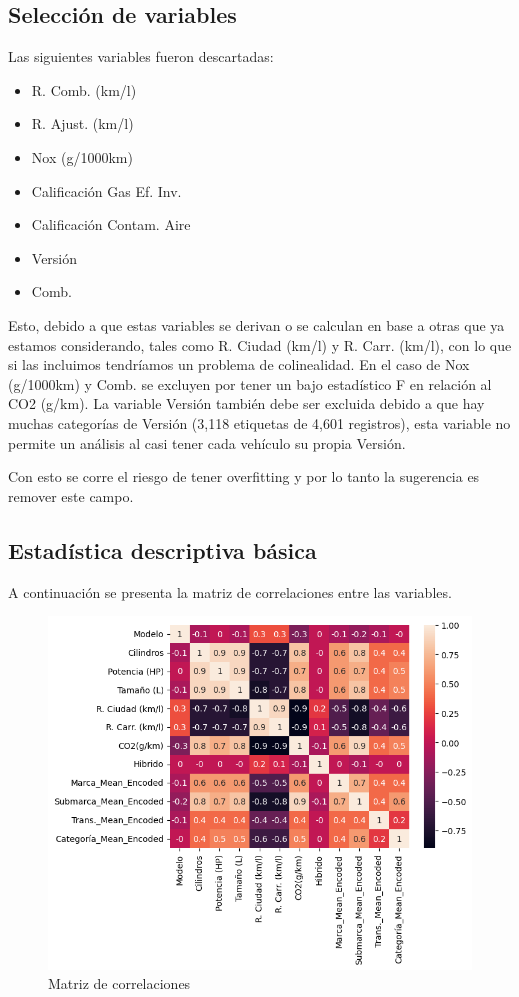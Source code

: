 \documentclass{article}
\begin{document}
\subsection{Selección de variables}

Las siguientes variables fueron descartadas:

\begin{itemize}
    \item R. Comb. (km/l)
    \item R. Ajust. (km/l)
    \item Nox (g/1000km)
    \item Calificación Gas Ef. Inv.
    \item Calificación Contam. Aire
    \item Versión
    \item Comb.
\end{itemize}

Esto, debido a que estas variables se derivan o se calculan en base a otras que ya estamos considerando, tales como R. Ciudad (km/l) y R. Carr. (km/l), con lo que si las incluimos tendríamos un problema de colinealidad. En el caso de Nox (g/1000km) y Comb. se excluyen por tener un bajo estadístico F en relación al CO2 (g/km). La variable Versión también debe ser excluida debido a que hay muchas categorías de Versión (3,118 etiquetas de 4,601 registros), esta variable no permite un análisis al casi tener cada vehículo su propia Versión.

Con esto se corre el riesgo de tener overfitting y por lo tanto la sugerencia es remover este campo.


\subsection{Estadística descriptiva básica}


A continuación se presenta la matriz de correlaciones entre las variables.

\begin{figure}[h]
  \centering
  \includegraphics[width=1\linewidth]{imagenes/1_correlations.png}
  \caption{Matriz de correlaciones}
  \label{fig:nombre}
\end{figure}
\end{document}

